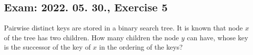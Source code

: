 \subsection{Exam: 2022. 05. 30., Exercise 5}


Pairwise distinct keys are stored in a binary search tree. It is known that
node $x$ of the tree has two children. How many children the node $y$ can have,
whose key is the successor of the key of $x$ in the ordering of the keys?



